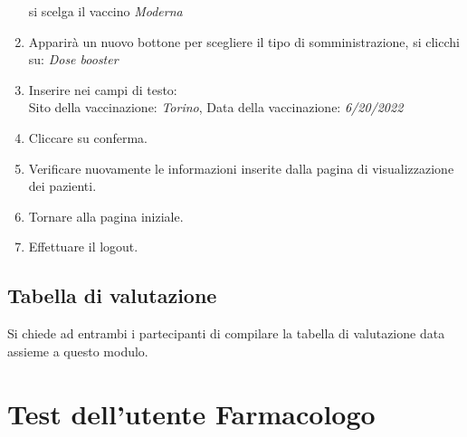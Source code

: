 \documentclass[11pt]{article}
\begin{document}
\begin{enumerate}
                    si scelga il vaccino \textit{Moderna}
                \item Apparirà un nuovo bottone per scegliere il tipo di somministrazione, si clicchi su: \textit{Dose booster}
                \item Inserire nei campi di testo:\\
                    Sito della vaccinazione: \textit{Torino}, Data della vaccinazione: \textit{6/20/2022}
                \item Cliccare su conferma.
                \item Verificare nuovamente le informazioni inserite dalla pagina di visualizzazione dei pazienti.
                \item Tornare alla pagina iniziale.
                \item Effettuare il logout.
            \end{enumerate}

        \subsection*{Tabella di valutazione}
            Si chiede ad entrambi i partecipanti di compilare la tabella di valutazione data assieme a questo modulo.

    \newpage
        \section*{Test dell'utente Farmacologo}
\end{document}
